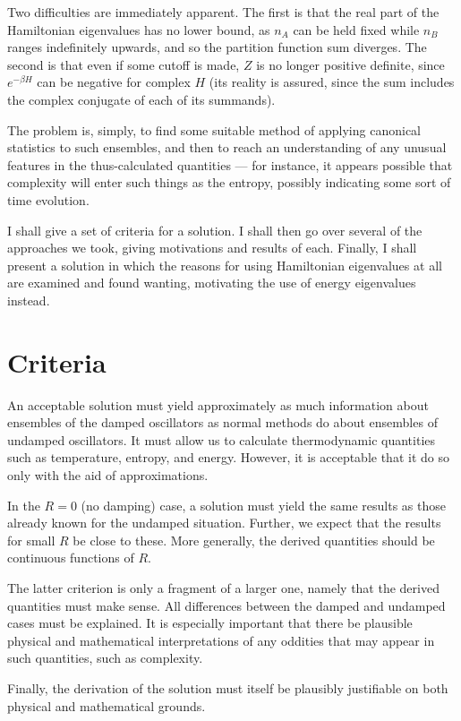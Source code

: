 Two difficulties are immediately apparent.  The first is that the real part of
the Hamiltonian eigenvalues has no lower bound, as $n_{A}$ can be held fixed
while $n_{B}$ ranges indefinitely upwards, and so the partition function sum
diverges.  The second is that even if some cutoff is made, $Z$ is no longer
positive definite, since $e^{- \beta H}$ can be negative for complex $H$
(its reality is assured, since the sum includes the complex conjugate of
each of its summands).

The problem is, simply, to find some suitable method of applying canonical 
statistics to such ensembles, and then to reach an understanding of any unusual
features in the thus-calculated quantities --- for instance, it appears
possible that complexity will enter such things as the entropy, possibly
indicating some sort of time evolution.  

I shall give a set of criteria for a solution.  I shall then go over several
of the approaches we took, giving motivations and results of
each.  Finally, I shall present a solution in which the reasons for using
Hamiltonian eigenvalues at all are examined and found wanting, motivating the
use of energy eigenvalues instead.

\newpage
\chapter{Criteria}

An acceptable solution must yield approximately as much information about
ensembles of the damped oscillators as normal methods do about ensembles of
undamped oscillators.  It must allow us to calculate thermodynamic quantities
such as temperature, entropy, and energy.  However, it is acceptable that
it do so only with the aid of approximations.  

In the $R = 0$ (no damping) case, a solution must yield the same results as
those already known for the undamped situation.  Further, we expect that the
results for small $R$ be close to these.  More generally, the derived
quantities should be continuous functions of $R$.

The latter criterion is only a fragment of a larger one, namely that the
derived quantities must make sense.  All differences between the damped and
undamped cases must be explained.  It is especially important that there be
plausible physical and mathematical interpretations of any oddities that may
appear in such quantities, such as complexity.  

Finally, the derivation of the solution must itself be plausibly justifiable
on both physical and mathematical grounds.

